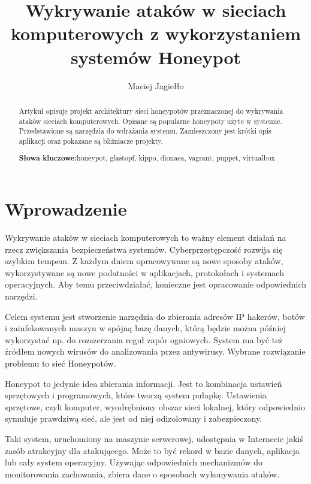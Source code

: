 \documentclass[runningheads,a4paper]{llncs}
\newcommand{\keywords}[1]{\par\addvspace\baselineskip
\noindent\keywordname\enspace\ignorespaces#1}
\renewcommand{\keywordname}{\textbf{Słowa kluczowe:}}
\begin{document}
\mainmatter
\title{Wykrywanie ataków w sieciach komputerowych z wykorzystaniem systemów Honeypot}
\author{Maciej Jagiełło}

\titlerunning{ }
\authorrunning{ }
\institute{}
\maketitle

\begin{abstract}
Artykuł opisuje projekt architektury sieci honeypotów przeznaczonej do wykrywania ataków sieciach komputerowych. Opisane są popularne honeypoty użyte w systemie. Przedstawione są narzędzia do wdrażania systemu. Zamieszczony jest krótki opis aplikacji oraz pokazane są bliźniacze projekty.
\keywords{honeypot, glastopf, kippo, dionaea, vagrant, puppet, virtualbox}
\end{abstract}


\section{Wprowadzenie}

Wykrywanie ataków w sieciach komputerowych to ważny element działań na rzecz zwiększania bezpieczeństwa systemów. Cyberprzestępczość rozwija się szybkim tempem. Z każdym dniem opracowywane są nowe sposoby ataków, wykorzystywane są nowe podatności w aplikacjach, protokołach i systemach operacyjnych. Aby temu przeciwdziałać, konieczne jest opracowanie odpowiednich narzędzi.

Celem systemu jest stworzenie narzędzia do zbierania adresów IP hakerów, botów i zainfekowanych maszyn w spójną bazę danych, którą będzie można później wykorzystać np. do rozszerzania reguł zapór ogniowych. System ma być też źródłem nowych wirusów do analizowania przez antywirusy. Wybrane rozwiązanie problemu to sieć Honeypotów.

Honeypot to jedynie idea zbierania informacji. Jest to kombinacja ustawień sprzętowych i programowych, które tworzą system pułapkę. Ustawienia sprzętowe, czyli komputer, wyodrębniony obszar sieci lokalnej, który odpowiednio symuluje prawdziwą sieć, ale jest od niej odizolowany i zabezpieczony.

Taki system, uruchomiony na maszynie serwerowej, udostępnia w Internecie jakiś zasób atrakcyjny dla atakującego. Może to być rekord w bazie danych, aplikacja lub cały system operacyjny. Używając odpowiednich mechanizmów do monitorowania zachowania, zbiera dane o sposobach wykonywania ataków.
\end{document}
